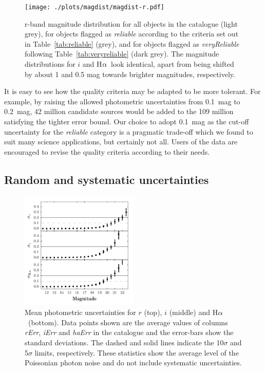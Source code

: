 \documentclass[useAMS,usenatbib]{mn2e}
\def\ha{\mbox{H$\rm \alpha$}}
\begin{document}
\begin{figure}
    \texttt{[image: ./plots/magdist/magdist-r.pdf]} 
    \caption{r-band magnitude distribution for all objects in the catalogue 
    (light grey), for objects flagged as \emph{reliable} 
    according to the criteria set out in Table~\ref{tab:reliable} (grey),
    and for objects flagged as \emph{veryReliable} 
    following Table~\ref{tab:veryreliable} (dark grey).
    The magnitude distributions for $i$ and \ha\
    look identical, apart from being shifted
    by about 1 and 0.5 mag towards brighter magnitudes,
    respectively.}
    \label{fig:magdist}
\end{figure}

It is easy to see how the quality criteria
may be adapted to be more tolerant.
For example, by raising the allowed photometric uncertainties
from 0.1~mag to 0.2~mag,
42 million candidate sources would be added to the 109 
million satisfying the tighter error bound.
Our choice to adopt 0.1~mag as the cut-off uncertainty
for the \emph{reliable} category is a pragmatic trade-off
which we found to suit many science applications,
but certainly not all. Users of the data are encouraged 
to revise the quality criteria according to their needs.

\subsection{Random and systematic uncertainties}

\begin{figure}
    \includegraphics[width=0.5\textwidth]{figures/uncertainties/uncertainties.pdf} 
    \caption{Mean photometric uncertainties
             for $r$ (top), $i$ (middle) and \ha\ (bottom).
             Data points shown are the average values of
             columns \emph{rErr}, \emph{iErr} and \emph{haErr}
             in the catalogue 
             and the error-bars show the standard deviations.
             The dashed and solid lines indicate 
             the 10$\sigma$ and 5$\sigma$ limits, respectively.
             These statistics show the average level of the Poissonian
             photon noise and do not include systematic uncertainties.}
    \label{fig:uncertainties}
\end{figure}
\end{document}
